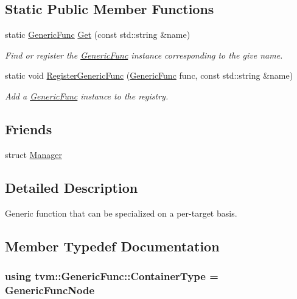 \subsection*{Static Public Member Functions}
\begin{DoxyCompactItemize}
\item 
static \hyperlink{classtvm_1_1GenericFunc}{Generic\+Func} \hyperlink{classtvm_1_1GenericFunc_a74a6f06af50db51c3ff42fd493c44826}{Get} (const std\+::string \&name)
\begin{DoxyCompactList}\small\item\em Find or register the \hyperlink{classtvm_1_1GenericFunc}{Generic\+Func} instance corresponding to the give name. \end{DoxyCompactList}\item 
static void \hyperlink{classtvm_1_1GenericFunc_a909acecbf2f34f847a34e587a4570dce}{Register\+Generic\+Func} (\hyperlink{classtvm_1_1GenericFunc}{Generic\+Func} func, const std\+::string \&name)
\begin{DoxyCompactList}\small\item\em Add a \hyperlink{classtvm_1_1GenericFunc}{Generic\+Func} instance to the registry. \end{DoxyCompactList}\end{DoxyCompactItemize}
\subsection*{Friends}
\begin{DoxyCompactItemize}
\item 
struct \hyperlink{classtvm_1_1GenericFunc_a1fd6b9bc3f72bb2b64e602de3982929d}{Manager}
\end{DoxyCompactItemize}


\subsection{Detailed Description}
Generic function that can be specialized on a per-\/target basis. 

\subsection{Member Typedef Documentation}
\subsubsection[{\texorpdfstring{Container\+Type}{ContainerType}}]{\setlength{\rightskip}{0pt plus 5cm}using {\bf tvm\+::\+Generic\+Func\+::\+Container\+Type} =  {\bf Generic\+Func\+Node}}\hypertarget{classtvm_1_1GenericFunc_adb9e6551f7f52018f1641198bd08574f}{}\label{classtvm_1_1GenericFunc_adb9e6551f7f52018f1641198bd08574f}


